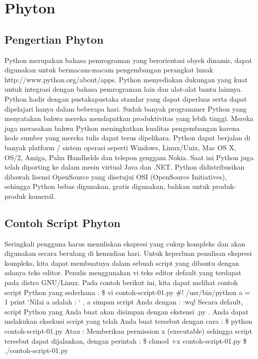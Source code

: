 \section{Phyton} 
\subsection{Pengertian Phyton}
Python merupakan bahasa pemrograman yang
berorientasi obyek dinamis, dapat digunakan
untuk bermacam-macam pengembangan perangkat
lunak http://www.python.org/about/apps. Python
menyediakan dukungan yang kuat untuk integrasi
dengan bahasa pemrograman lain dan alat-alat
bantu lainnya. Python hadir dengan pustakapustaka
standar yang dapat diperluas serta dapat
dipelajari hanya dalam beberapa hari. Sudah
banyak programmer Python yang menyatakan
bahwa mereka mendapatkan produktivitas yang
lebih tinggi. Mereka juga merasakan bahwa Python
meningkatkan kualitas pengembangan karena kode
sumber yang mereka tulis dapat terus dipelihara.
Python dapat berjalan di banyak platform / sistem
operasi seperti Windows, Linux/Unix, Mac OS X,
OS/2, Amiga, Palm Handhelds dan telepon genggam
Nokia. Saat ini Python juga telah diporting ke dalam
mesin virtual Java dan .NET.
Python didistribusikan dibawah lisensi
OpenSource yang disetujui OSI (OpenSource
Initiatives), sehingga Python bebas digunakan,
gratis digunakan, bahkan untuk produk-produk
komersil.

\subsection{Contoh Script Phyton}
Seringkali pengguna harus menuliskan ekspresi yang cukup kompleks dan akan digunakan secara berulang di kemudian hari. 
Untuk keperluan penulisan ekspresi kompleks, kita dapat membuatnya dalam sebuah script yang dibantu dengan adanya teks editor. 
Penulis menggunakan vi teks editor default yang terdapat pada distro GNU/Linux. Pada contoh berikut ini, 
kita dapat melihat contoh script Python yang sederhana : 
\$ vi contoh-script-01.py \#! /usr/bin/python a = 1 print 
‘Nilai a adalah : ‘ , a simpan script Anda dengan : :wq! Secara default, script Python yang Anda buat akan disimpan dengan ekstensi .py . 
Anda dapat melakukan eksekusi script yang telah Anda buat tersebut dengan cara : 
\$ python contoh-script-01.py 
Atau : Memberikan permission x (executable) sehingga script tersebut dapat dijalankan, 
dengan perintah : \$ chmod +x contoh-script-01.py \$ ./contoh-script-01.py


